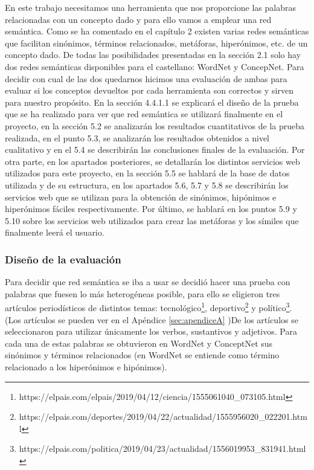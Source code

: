 En este trabajo necesitamos una herramienta que nos proporcione las palabras relacionadas con un concepto dado y para ello vamos a emplear una red semántica.
Como se ha comentado en el capítulo 2 existen varias redes semánticas que facilitan sinónimos, términos relacionados, metáforas, hiperónimos, etc. de un concepto dado. 
De todas las posibilidades presentadas en la sección 2.1 solo hay dos redes semánticas disponibles para el castellano: WordNet y ConcepNet. Para decidir con cual de las dos quedarnos hicimos una evaluación de ambas para evaluar si los conceptos devueltos por cada herramienta son correctos y sirven para nuestro propósito. En la sección 4.4.1.1 se explicará el diseño de la prueba que se ha realizado para ver que red semántica se utilizará finalmente en el proyecto, en la sección 5.2 se analizarán los resultados cuantitativos de la prueba realizada, en el punto 5.3, se analizarán los resultados obtenidos a nivel cualitativo y en el 5.4 se describirán las conclusiones finales de la evaluación. Por otra parte, en los apartados posteriores, se detallarán los distintos servicios web utilizados para este proyecto, en la sección 5.5 se hablará de la base de datos utilizada y de su estructura, en los apartados 5.6, 5.7 y 5.8 se describirán los servicios web que se utilizan para la obtención de sinónimos, hipónimos e hiperónimos fáciles respectivamente. Por último, se hablará en los puntos 5.9 y 5.10 sobre los servicios web utilizados para crear las metáforas y los símiles que finalmente leerá el usuario.


\subsubsection{Diseño de la evaluación}
\label{cap:subsec:disenioeval}


Para decidir que red semántica se iba a usar se decidió hacer una prueba con palabras que fuesen lo más heterogéneas posible, para ello se eligieron tres artículos periodísticos de distintos temas: tecnológico\footnote{https://elpais.com/elpais/2019/04/12/ciencia/1555061040\_073105.html}, deportivo\footnote{https://elpais.com/deportes/2019/04/22/actualidad/1555956020\_022201.html} y político\footnote{https://elpais.com/politica/2019/04/23/actualidad/1556019953\_831941.html}. (Los artículos se pueden ver en el Apéndice \ref{sec:apendiceA} )De los artículos se seleccionaron para utilizar únicamente los verbos, sustantivos y adjetivos. Para cada una de estas palabras se obtuvieron en WordNet y ConceptNet sus sinónimos y términos relacionados (en WordNet se entiende como término relacionado a los hiperónimos e hipónimos).

